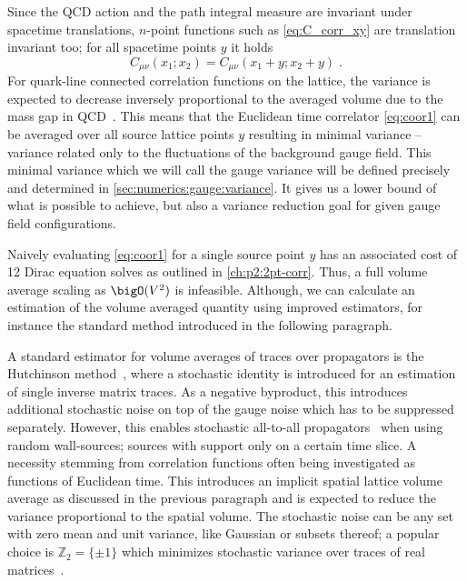 Since the QCD action and the path integral measure are invariant under spacetime translations, $n$-point functions such as \cref{eq:C_corr_xy} are translation invariant too; for all spacetime points $y$ it holds
\begin{equation} \label{eq:translation:average}
C_{\mu \nu}(x_1; x_2) = C_{\mu \nu}(x_1 + y; x_2 + y) \;.
\end{equation}
For quark-line connected correlation functions on the lattice, the variance is expected to decrease inversely proportional to the averaged volume due to the mass gap in QCD~\cite{Luscher:2017cjh}.
This means that the Euclidean time correlator \cref{eq:coor1} can be averaged over all source lattice points $y$ resulting in minimal variance -- variance related only to the fluctuations of the background gauge field.
This minimal variance which we will call the gauge variance will be defined precisely and determined in \cref{sec:numerics:gauge:variance}.
It gives us a lower bound of what is possible to achieve, but also a variance reduction goal for given gauge field configurations.

Naively evaluating \cref{eq:coor1} for a single source point $y$ has an associated cost of \num{12} Dirac equation solves as outlined in \cref{ch:p2:2pt-corr}.
Thus, a full volume average scaling as $\bigO(V^{2})$ is infeasible.
Although, we can calculate an estimation of the volume averaged quantity using improved estimators, for instance the standard method introduced in the following paragraph.


A standard estimator for volume averages of traces over propagators is the Hutchinson method~\cite{Hutchinson01011990}, where a stochastic identity is introduced for an estimation of single inverse matrix traces.
As a negative byproduct, this introduces additional stochastic noise on top of the gauge noise which has to be suppressed separately.
However, this enables stochastic all-to-all propagators~\cite{Foley:2005ac} when using random wall-sources; sources with support only on a certain time slice.
A necessity stemming from correlation functions often being investigated as functions of Euclidean time.
This introduces an implicit spatial lattice volume average as discussed in the previous paragraph and is expected to reduce the variance proportional to the spatial volume.
The stochastic noise can be any set with zero mean and unit variance, like Gaussian or subsets thereof; a popular choice is $\mathbb{Z}_2 = \{\pm 1\}$ which minimizes stochastic variance over traces of real matrices~\cite{Bernardson:1993he}.

